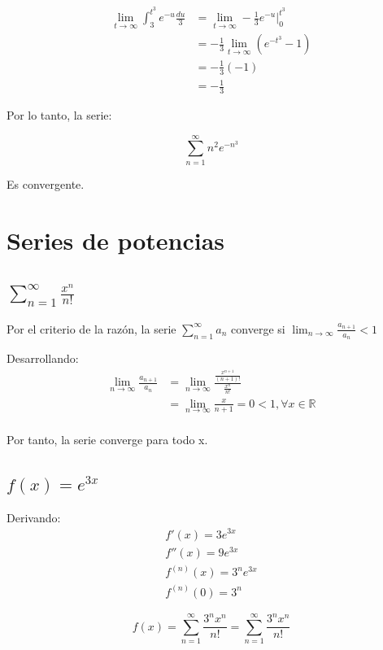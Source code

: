 \documentclass{article}
\begin{document}
\begin{align*}
\lim_{t \to \infty} \int_{3}^{t^3} e^{-u} \frac{du}{3} &= \lim_{t \to \infty}-\frac{1}{3} e^{-u} \big|_0^{t^3} \\ 
&= -\frac{1}{3} \lim_{t \to \infty} (e^{-t^3} - 1) \\ 
&= -\frac{1}{3} (-1)\\ 
&= -\frac{1}{3}
\end{align*}

Por lo tanto, la serie:

\[
\sum_{n = 1}^{\infty} n^2 e^{-n^3}
\]

Es convergente.

\section{Series de potencias}

\subsection{$\sum_{n = 1}^{\infty} \frac{x^n}{n!}$}

Por el criterio de la razón, la serie $\sum_{n = 1}^{\infty} a_n$ converge si $\lim_{n \to \infty} \frac{a_{n + 1}}{a_n} < 1$

Desarrollando:
\begin{align*}
\lim_{n \to \infty} \frac{a_{n + 1}}{a_n} &= \lim_{n \to \infty} \frac{\frac{x^{n + 1}}{(n + 1)!}}{\frac{x^n}{n!}} \\
&= \lim_{n \to \infty} \frac{x}{n + 1} = 0 < 1, \forall x \in \mathbb{R} \\
\end{align*}

Por tanto, la serie converge para todo x.

\subsection{$f(x) = e^{3x}$}

Derivando:
\begin{align*}
f'(x) = 3e^{3x} \\
f''(x) = 9e^{3x} \\
f^{(n)}(x) = 3^n e^{3x} \\
f^{(n)}(0) = 3^n
\end{align*}

\[
f(x) = \sum_{n = 1}^{\infty} \frac{3^n x^n}{n!} = \sum_{n = 1}^{\infty} \frac{3^n x^n}{n!}
\]
\end{document}
